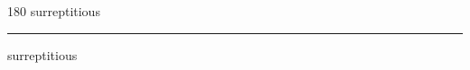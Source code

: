
\begin{frame}
\begin{center}
\begin{turn}{180}
{\fontsize{2.5cm}{1em}\selectfont surreptitious}
\end{turn}
\vspace{1em}\par  
\hrule
\vspace{1em}\par  
{\fontsize{2.5cm}{1em}\selectfont surreptitious}
\end{center}
\end{frame}
